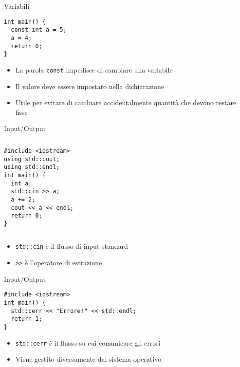 \begin{frame}[fragile]{Variabili}
  \vfill
  \begin{lstlisting}
int main() {
  const int a = 5;
  a = 4;
  return 0;
}
  \end{lstlisting}
  \vfill
  \begin{itemize}
    \item La parola \lstinline$const$ impedisce di cambiare una variabile
    \vfill
    \item Il valore deve essere impostato nella dichiarazione
    \vfill
    \item Utile per evitare di cambiare accidentalmente quantità che devono restare fisse
  \end{itemize}
  \vfill
\end{frame}

\begin{frame}[fragile]{Input/Output}
  \vfill
  \begin{columns}[c]
    \vfill
    \begin{lstlisting}
#include <iostream>
using std::cout;
using std::endl;
int main() {
  int a;
  std::cin >> a;
  a += 2;
  cout << a << endl;
  return 0;
}
    \end{lstlisting}
    \vfill
    \vfill
    \begin{center}\end{center}
    \vfill
  \end{columns}
  \vfill
  \begin{itemize}
    \item \lstinline$std::cin$ è il flusso di input standard
    \vfill
    \item \lstinline$>>$ è l'operatore di \alert{estrazione}
  \end{itemize}
  \vfill
\end{frame}

\begin{frame}[fragile]{Input/Output}
  \vfill
  \begin{lstlisting}
#include <iostream>
int main() {
  std::cerr << "Errore!" << std::endl;
  return 1;
}
  \end{lstlisting}
  \vfill
  \begin{itemize}
    \item \lstinline$std::cerr$ è il flusso su cui comunicare gli errori
    \vfill
    \item Viene gestito diversamente dal sistema operativo
  \end{itemize}
  \vfill
\end{frame}

